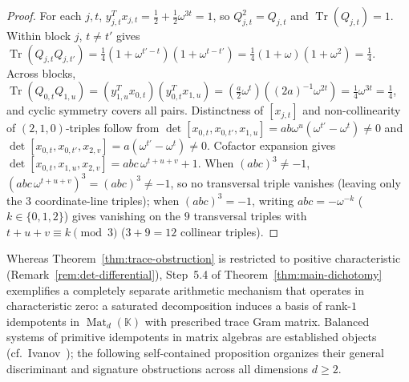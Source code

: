 \documentclass[11pt,reqno]{amsart}
\theoremstyle{definition}
\theoremstyle{remark}
\numberwithin{equation}{section}
\newcommand{\KK}{\mathbb{K}}
\DeclareMathOperator{\Mat}{Mat}
\DeclareMathOperator{\Tr}{Tr}
\begin{document}
\begin{proof}
For each $j, t$, $y_{j,t}^T x_{j,t} = \frac{1}{2} + \frac{1}{2}\omega^{3t} = 1$, so $Q_{j,t}^2 = Q_{j,t}$ and $\Tr(Q_{j,t}) = 1$. Within block $j$, $t \neq t'$ gives $\Tr(Q_{j,t} Q_{j,t'}) = \frac{1}{4}(1 + \omega^{t'-t})(1 + \omega^{t-t'}) = \frac{1}{4}(1 + \omega)(1 + \omega^2) = \frac{1}{4}$. Across blocks, $\Tr(Q_{0,t} Q_{1,u}) = (y_{1,u}^T x_{0,t})(y_{0,t}^T x_{1,u}) = (\frac{a}{2}\omega^t)((2a)^{-1}\omega^{2t}) = \frac{1}{4}\omega^{3t} = \frac{1}{4}$, and cyclic symmetry covers all pairs. Distinctness of $[x_{j,t}]$ and non-collinearity of $(2, 1, 0)$-triples follow from $\det[x_{0,t}, x_{0,t'}, x_{1,u}] = ab\omega^u(\omega^{t'} - \omega^t) \neq 0$ and $\det[x_{0,t}, x_{0,t'}, x_{2,v}] = a(\omega^{t'} - \omega^t) \neq 0$. Cofactor expansion gives $\det[x_{0,t}, x_{1,u}, x_{2,v}] = abc\,\omega^{t+u+v} + 1$. When $(abc)^3 \neq -1$, $(abc\,\omega^{t+u+v})^3 = (abc)^3 \neq -1$, so no transversal triple vanishes (leaving only the $3$ coordinate-line triples); when $(abc)^3 = -1$, writing $abc = -\omega^{-k}$ ($k \in \{0, 1, 2\}$) gives vanishing on the $9$ transversal triples with $t + u + v \equiv k \pmod 3$ ($3 + 9 = 12$ collinear triples).
\end{proof}

Whereas Theorem~\ref{thm:trace-obstruction} is restricted to positive characteristic (Remark~\ref{rem:det-differential}), Step~5.4 of Theorem~\ref{thm:main-dichotomy} exemplifies a completely separate arithmetic mechanism that operates in characteristic zero: a saturated decomposition induces a basis of rank-$1$ idempotents in $\Mat_d(\KK)$ with prescribed trace Gram matrix. Balanced systems of primitive idempotents in matrix algebras are established objects (cf.\ Ivanov~\cite{Ivanov2000}); the following self-contained proposition organizes their general discriminant and signature obstructions across all dimensions $d \ge 2$.
\end{document}
